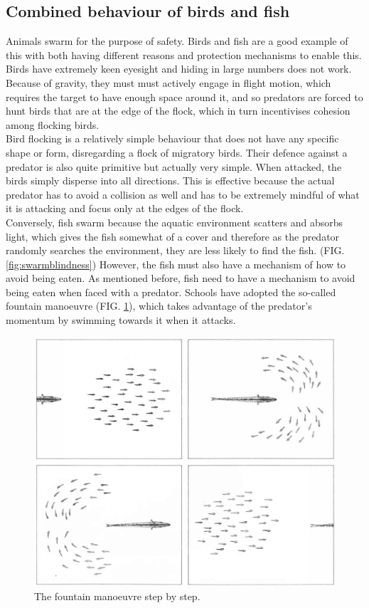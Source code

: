 \documentclass[
reprint,
showpacs,
preprintnumbers,
bibnotes,
amsmath,
amssymb,
aps,
pra,
floatfix,
]{revtex4-1}
\begin{document}
\subsection{\label{sec:birdsvfish}Combined behaviour of birds and fish}
Animals swarm for the purpose of safety.
Birds and fish are a good example of this with both having different reasons and protection mechanisms to enable this.\\
\indent Birds have extremely keen eyesight and hiding in large numbers does not work.
Because of gravity, they must must actively engage in flight motion, which requires the target to have enough space around it, and so predators are forced to hunt birds that are at the edge of the flock, which in turn incentivises cohesion among flocking birds.\\
\indent Bird flocking is a relatively simple behaviour that does not have any specific shape or form, disregarding a flock of migratory birds.
Their defence against a predator is also quite primitive but actually very simple.
When attacked, the birds simply disperse into all directions. This is effective because the actual predator has to avoid a collision as well and has to be extremely mindful of what it is attacking and focus only at the edges of the flock.\\
\indent Conversely, fish swarm because the aquatic environment scatters and absorbs light, which gives the fish somewhat of a cover and therefore as the predator randomly searches the environment, they are less likely to find the fish. (FIG. \ref{fig:swarmblindness})
However, the fish must also have a mechanism of how to avoid being eaten.
As mentioned before, fish need to have a mechanism to avoid being eaten when faced with a predator.
Schools have adopted the so-called fountain manoeuvre (FIG. \ref{fig:fountain}), which takes advantage of the predator's momentum by swimming towards it when it attacks.

\begin{figure}[!htp]
	\includegraphics[width=1.0\linewidth]{images/partridgeFountain.png}

	\caption{
		The fountain manoeuvre step by step.
	}

	\label{fig:fountain}
\end{figure}
\end{document}
